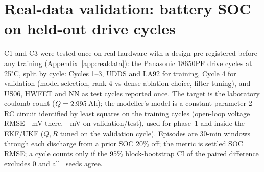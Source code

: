 \section{Real-data validation: battery SOC on held-out drive cycles}\label{sec:realdata}

C1 and C3 were tested once on real hardware with a design pre-registered before any training (Appendix~\ref{app:realdata}): the Panasonic 18650PF drive cycles \citep{kollmeyer2018panasonic} at 25$^\circ$C, split by cycle: Cycles 1--3, UDDS and LA92 for training, Cycle 4 for validation (model selection, rank-4-vs-dense-ablation choice, filter tuning), and US06, HWFET and NN as test cycles reported once. The target is the laboratory coulomb count ($Q=2.995$\,Ah); the modeller's model is a constant-parameter 2-RC circuit identified by least squares on the training cycles (open-loop voltage RMSE \RealVmFitTrainMin--\RealVmFitTrainMax\,mV there, \RealVmFitValTestMin--\RealVmFitValTestMax\,mV on validation/test), used for phase~1 and inside the EKF/UKF ($Q,R$ tuned on the validation cycle). Episodes are 30-min windows through each discharge from a prior SOC 20\% off; the metric is settled SOC RMSE; a cycle counts only if the 95\% block-bootstrap CI of the paired difference excludes 0 and all \RealNSeeds\ seeds agree.

